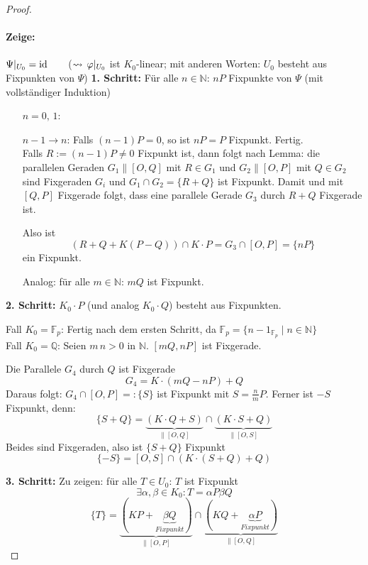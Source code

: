 \documentclass[parskip,a4paper,twoside,DIV15,BCOR12mm]{scrbook}
\begin{document}
\begin{proof}
\paragraph{Zeige:}{\(\Psi|_{U_{0}}=\operatorname{id}\qquad\)(\(\leadsto\,\varphi|_{U_{0}}\) ist
\(K_{0}\)-linear; mit anderen Worten: \(U_{0}\) besteht aus Fixpunkten von
\(\Psi\))}
\textbf{1. Schritt:} Für alle \(n\in\mathbb{N}:\,nP\) Fixpunkte von \(\Psi\)
(mit vollständiger Induktion)
\begin{itemize}
\item[\(n=0,\,1\):]\checkmark
\item[\(n-1\to n\):] Falls \((n-1)P=0\), so ist \(nP=P\) Fixpunkt. Fertig.\\
Falls \(R:=(n-1)P\neq0\) Fixpunkt ist, dann folgt nach Lemma: die parallelen
Geraden \(G_{1}\parallel[O,Q]\) mit \(R\in G_{1}\) und \(G_{2}\parallel[O,P]\)
mit \(Q\in G_{2}\) sind Fixgeraden \(G_{i}\) und \(G_{1}\cap G_{2}=\{R+Q\}\) ist
Fixpunkt. Damit und mit \([Q,P]\) Fixgerade folgt, dass eine parallele Gerade
\(G_{3}\) durch \(R+Q\) Fixgerade ist.

Also ist
\[
\left(R+Q+K(P-Q)\right)\cap K\cdot P=G_{3}\cap[O,P]=\{nP\}
\]
ein Fixpunkt.

Analog: für alle \(m\in\mathbb{N}:\,mQ\) ist Fixpunkt.
\end{itemize}

\textbf{2. Schritt:} \(K_{0}\cdot P\) (und analog \(K_{0}\cdot Q\)) besteht aus
Fixpunkten.

Fall \(K_{0}=\mathbb{F}_{p}\): Fertig nach dem ersten Schritt, da 
\(\mathbb{F}_{p}=\{n-1_{\mathbb{F}_{p}}\mid n\in\mathbb{N}\}\)\\
Fall \(K_{0}=\mathbb{Q}\): Seien \(m\,n>0\) in \(\mathbb{N}\). \([mQ,nP]\) ist
Fixgerade.

Die Parallele \(G_{4}\) durch \(Q\) ist Fixgerade
\[
G_{4}=K\cdot(mQ-nP)+Q
\]
Daraus folgt: \(G_{4}\cap[O,P]=:\{S\}\) ist Fixpunkt mit \(S=\frac{n}{m}P\).
Ferner ist \(-S\) Fixpunkt, denn:
\[
\{S+Q\}=\underbrace{(K\cdot Q+S)}_{\parallel[O,Q]}\cap
    \underbrace{(K\cdot S+Q)}_{\parallel[O,S]}
\]
Beides sind Fixgeraden, also ist \(\{S+Q\}\) Fixpunkt
\[
\{-S\}=[O,S]\cap(K\cdot(S+Q)+Q)
\]

\textbf{3. Schritt:} Zu zeigen: für alle \(T\in U_0:\,T\) ist Fixpunkt
\[\exists \alpha,\beta\in K_0: T=\alpha P\beta Q\]
\[\{T\}=\underbrace{(KP+\underbrace{\beta Q}_{Fixpunkt})}_{\parallel [O,P]}\cap \underbrace{(KQ+\underbrace{\alpha P}_{Fixpunkt})}_{\parallel [O,Q]}\]
\end{proof}
\end{document}
